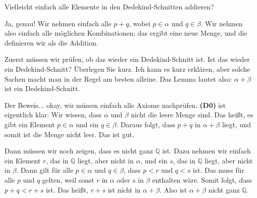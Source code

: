 \begin{student-interaction}
Vielleicht einfach alle Elemente in den Dedekind-Schnitten addieren?
\end{student-interaction}

\begin{spoken-clean}[00:52:00 - 00:53:12]
Ja, genau! Wir nehmen einfach alle $p + q$, wobei $p \in \alpha$ und $q \in \beta$. Wir nehmen also einfach alle möglichen Kombinationen; das ergibt eine neue Menge, und die definieren wir als die Addition.
\end{spoken-clean}

\begin{math-stroke}

\end{math-stroke}

\begin{spoken-clean}[00:53:12 - 00:55:29]
Zuerst müssen wir prüfen, ob das wieder ein Dedekind-Schnitt ist. Ist das wieder ein Dedekind-Schnitt? Überlegen Sie kurz. Ich kann es kurz erklären, aber solche Sachen macht man in der Regel am besten alleine. Das Lemma lautet also: $\alpha + \beta$ ist ein Dedekind-Schnitt.

Der Beweis... okay, wir müssen einfach alle Axiome nachprüfen. \textbf{(D0)} ist eigentlich klar: Wir wissen, dass $\alpha$ und $\beta$ nicht die leere Menge sind. Das heißt, es gibt ein Element $p \in \alpha$ und ein $q \in \beta$. Daraus folgt, dass $p + q$ in $\alpha + \beta$ liegt, und somit ist die Menge nicht leer. Das ist gut.

Dann müssen wir noch zeigen, dass es nicht ganz $\mathbb{Q}$ ist. Dazu nehmen wir einfach ein Element $r$, das in $\mathbb{Q}$ liegt, aber nicht in $\alpha$, und ein $s$, das in $\mathbb{Q}$ liegt, aber nicht in $\beta$. Dann gilt für alle $p \in \alpha$ und $q \in \beta$, dass $p < r$ und $q < s$ ist. Das muss für alle $p$ und $q$ gelten, weil sonst $r$ in $\alpha$ oder $s$ in $\beta$ enthalten wäre. Somit folgt, dass $p + q < r + s$ ist. Das heißt, $r + s$ ist nicht in $\alpha + \beta$. Also ist $\alpha + \beta$ nicht ganz $\mathbb{Q}$.
\end{spoken-clean}

